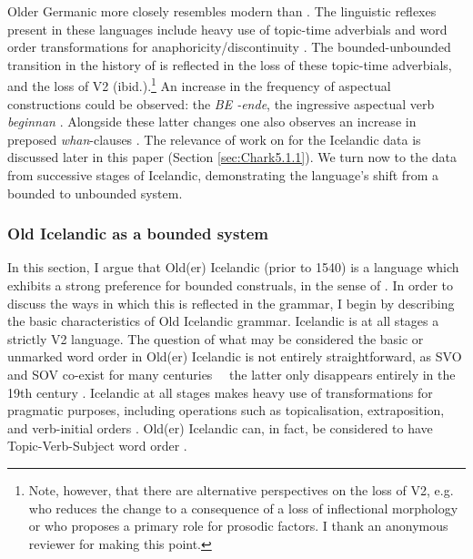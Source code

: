 \documentclass[output=paper,colorlinks,citecolor=brown]{langscibook}
\begin{document}
Older Germanic more closely resembles modern  than . The linguistic reflexes present in these languages include heavy use of topic-time adverbials and word order transformations for anaphoricity/discontinuity \citep{los2012}. The bounded-unbounded transition in the history of  is reflected in the loss of these topic-time adverbials, and the loss of V2 (ibid.).\footnote{Note, however, that there are alternative perspectives on the loss of V2, e.g. \citet{haeberli2002inflectional} who reduces the change to a consequence of a loss of inflectional morphology or \citet{speyer2010topicalization} who proposes a primary role for prosodic factors. I thank an anonymous reviewer for making this point.} An increase in the frequency of aspectual constructions could be observed: the   \textit{BE -ende}, the ingressive aspectual verb \textit{beginnan} \citep{petre2010functions, Los2000}. Alongside these latter changes one also observes an increase in preposed \textit{whan}-clauses \citep[169--172]{Brinton1996}. The relevance of work on  for the Icelandic data is discussed later in this paper (Section \ref{sec:Chark5.1.1}). We turn now to the data from successive stages of Icelandic, demonstrating the language's shift from a bounded to unbounded system.

\subsubsection{Old Icelandic as a bounded system}\label{sec:Chark4.2.1}

In this section, I argue that Old(er) Icelandic (prior to 1540) is a language which exhibits a strong preference for bounded construals, in the sense of \citet{von2002cross}. In order to discuss the ways in which this is reflected in the grammar, I begin by describing the basic characteristics of Old Icelandic grammar. Icelandic is at all stages a strictly V2 language. The question of what may be considered the basic or unmarked word order in Old(er) Icelandic is not entirely straightforward, as SVO and SOV co-exist for many centuries \citep{sigurdsson1988from, rognvaldsson1994breytileg, rognvaldsson1995old, rognvaldsson1996word}\ \textendash{}\  the latter only disappears entirely in the 19th century \citep{hroarsdottir2000word}. Icelandic at all stages makes heavy use of transformations for pragmatic purposes, including operations such as topicalisation, extraposition, and verb-initial orders \citep{Faarlund1990, booth_revisiting_2021}. Old(er) Icelandic can, in fact, be considered to have Topic-Verb-Subject word order \citep{nielsen2017remark}.
\end{document}
